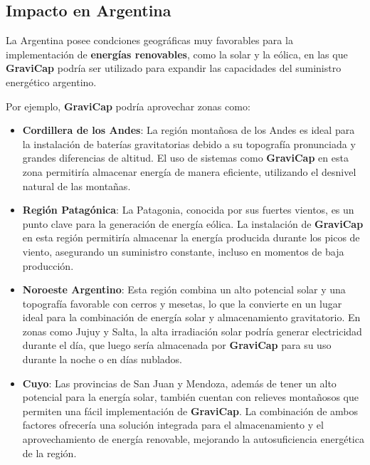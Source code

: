             \subsection{Impacto en Argentina}
                La Argentina posee condciones geográficas muy favorables para la implementación de \textbf{energías renovables}, como la solar y la eólica, en las que \textcolor{dark_violet}{\textbf{GraviCap}} podría ser utilizado para expandir las capacidades del suministro energético argentino.\par
                Por ejemplo, \textcolor{dark_violet}{\textbf{GraviCap}} podría aprovechar zonas como:\par
                \begin{itemize} [label=•]
                    \setlength{\itemindent}{1.5em}
                    
                    \item \textbf{Cordillera de los Andes}: La región montañosa de los Andes es ideal para la instalación de baterías gravitatorias debido a su topografía pronunciada y grandes diferencias de altitud. El uso de sistemas como \textcolor{dark_violet}{\textbf{GraviCap}} en esta zona permitiría almacenar energía de manera eficiente, utilizando el desnivel natural de las montañas.\par
                    \item \textbf{Región Patagónica}: La Patagonia, conocida por sus fuertes vientos, es un punto clave para la generación de energía eólica. La instalación de \textcolor{dark_violet}{\textbf{GraviCap}} en esta región permitiría almacenar la energía producida durante los picos de viento, asegurando un suministro constante, incluso en momentos de baja producción.\par
                    \item \textbf{Noroeste Argentino}: Esta región combina un alto potencial solar y una topografía favorable con cerros y mesetas, lo que la convierte en un lugar ideal para la combinación de energía solar y almacenamiento gravitatorio. En zonas como Jujuy y Salta, la alta irradiación solar podría generar electricidad durante el día, que luego sería almacenada por \textcolor{dark_violet}{\textbf{GraviCap}} para su uso durante la noche o en días nublados.\par
                    \item \textbf{Cuyo}: Las provincias de San Juan y Mendoza, además de tener un alto potencial para la energía solar, también cuentan con relieves montañosos que permiten una fácil implementación de \textcolor{dark_violet}{\textbf{GraviCap}}. La combinación de ambos factores ofrecería una solución integrada para el almacenamiento y el aprovechamiento de energía renovable, mejorando la autosuficiencia energética de la región.\par
                \end{itemize}

